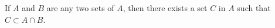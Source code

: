 If $A$ and $B$ are any two sets of $A$, then there exists a set $C$ in $A$ such that $C \subset A \cap B$.
